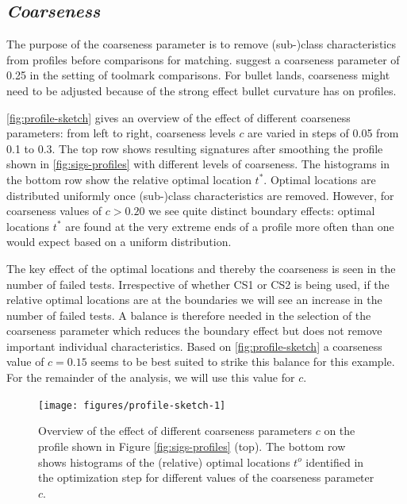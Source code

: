 \documentclass[12pt]{article}
\begin{document}
\hypertarget{coarseness}{%
\subsection*{\texorpdfstring{\emph{Coarseness}}{Coarseness}}\label{coarseness}}

The purpose of the coarseness parameter is to remove (sub-)class
characteristics from profiles before comparisons for matching.
\citet{hadler} suggest a coarseness parameter of 0.25 in the setting of
toolmark comparisons. For bullet lands, coarseness might need to be
adjusted because of the strong effect bullet curvature has on profiles.

\autoref{fig:profile-sketch} gives an overview of the effect of
different coarseness parameters: from left to right, coarseness levels
\(c\) are varied in steps of 0.05 from 0.1 to 0.3. The top row shows
resulting signatures after smoothing the profile shown in
\autoref{fig:sigs-profiles} with different levels of coarseness. The
histograms in the bottom row show the relative optimal location \(t^*\).
Optimal locations are distributed uniformly once (sub-)class
characteristics are removed. However, for coarseness values of
\(c > 0.20\) we see quite distinct boundary effects: optimal locations
\(t^*\) are found at the very extreme ends of a profile more often than
one would expect based on a uniform distribution.

The key effect of the optimal locations and thereby the coarseness is
seen in the number of failed tests. Irrespective of whether CS1 or CS2
is being used, if the relative optimal locations are at the boundaries
we will see an increase in the number of failed tests. A balance is
therefore needed in the selection of the coarseness parameter which
reduces the boundary effect but does not remove important individual
characteristics. Based on \autoref{fig:profile-sketch} a coarseness
value of \(c = 0.15\) seems to be best suited to strike this balance for
this example. For the remainder of the analysis, we will use this value
for \(c\).

\begin{figure}

{\centering \texttt{[image: figures/profile-sketch-1]} 

}

\caption{Overview of the effect of different coarseness parameters $c$ on the profile shown in Figure \ref{fig:sigs-profiles} (top). The bottom row shows histograms of  the (relative) optimal locations $t^o$ identified in the optimization step for different values of the coarseness parameter $c$. }\label{fig:profile-sketch}
\end{figure}
\end{document}
